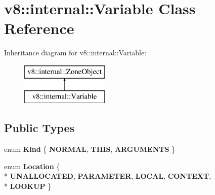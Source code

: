 \hypertarget{classv8_1_1internal_1_1_variable}{}\section{v8\+:\+:internal\+:\+:Variable Class Reference}
\label{classv8_1_1internal_1_1_variable}
Inheritance diagram for v8\+:\+:internal\+:\+:Variable\+:\begin{figure}[H]
\begin{center}
\leavevmode
\includegraphics[height=2.000000cm]{classv8_1_1internal_1_1_variable}
\end{center}
\end{figure}
\subsection*{Public Types}
\begin{DoxyCompactItemize}
\item 
\hypertarget{classv8_1_1internal_1_1_variable_a8d63c9319e6a17201b7c3585b5c09a45}{}enum {\bfseries Kind} \{ {\bfseries N\+O\+R\+M\+A\+L}, 
{\bfseries T\+H\+I\+S}, 
{\bfseries A\+R\+G\+U\+M\+E\+N\+T\+S}
 \}\label{classv8_1_1internal_1_1_variable_a8d63c9319e6a17201b7c3585b5c09a45}

\item 
\hypertarget{classv8_1_1internal_1_1_variable_ac699a342ec6e225e3fb032b31d12369c}{}enum {\bfseries Location} \{ \\*
{\bfseries U\+N\+A\+L\+L\+O\+C\+A\+T\+E\+D}, 
{\bfseries P\+A\+R\+A\+M\+E\+T\+E\+R}, 
{\bfseries L\+O\+C\+A\+L}, 
{\bfseries C\+O\+N\+T\+E\+X\+T}, 
\\*
{\bfseries L\+O\+O\+K\+U\+P}
 \}\label{classv8_1_1internal_1_1_variable_ac699a342ec6e225e3fb032b31d12369c}

\end{DoxyCompactItemize}
